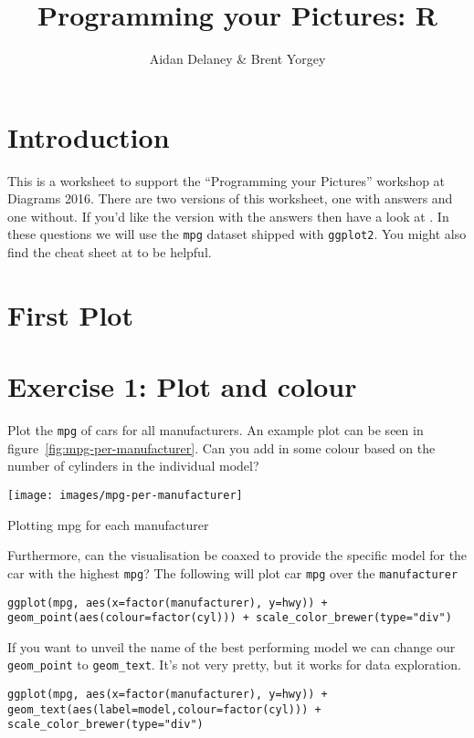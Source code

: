 \documentclass{tufte-handout}
\title{Programming your Pictures: R}
\author{Aidan Delaney \& Brent Yorgey}
\begin{document}
\maketitle
\section*{Introduction}
This is a worksheet to support the ``Programming your Pictures'' workshop at Diagrams 2016.  There are two versions of this worksheet, one with answers and one without.  If you'd like the version with the answers then have a look at .  In these questions we will use the \lstinline{mpg} dataset shipped with \lstinline{ggplot2}.  You might also find the cheat sheet at  to be helpful.

\section*{First Plot}

\section*{Exercise 1: Plot and colour}
Plot the \lstinline{mpg} of cars for all manufacturers.  An example plot can be seen in figure~\ref{fig:mpg-per-manufacturer}.  Can you add in some colour based on the number of cylinders in the individual model?
\begin{marginfigure}
  \texttt{[image: images/mpg-per-manufacturer]}
  \caption{Plotting mpg for each manufacturer}
  \label{fig:mpg-per-manufacturer}
\end{marginfigure}

\noindent Furthermore, can the visualisation be coaxed to provide the specific model for the car with the highest \lstinline{mpg}?
\ifanswers
The following will plot car \lstinline{mpg} over the \lstinline{manufacturer}
\begin{lstlisting}
ggplot(mpg, aes(x=factor(manufacturer), y=hwy)) + geom_point(aes(colour=factor(cyl))) + scale_color_brewer(type="div")
\end{lstlisting}

If you want to unveil the name of the best performing model we can change our \lstinline{geom_point} to \lstinline{geom_text}.  It's not very pretty, but it works for data exploration.
\begin{lstlisting}
ggplot(mpg, aes(x=factor(manufacturer), y=hwy)) + geom_text(aes(label=model,colour=factor(cyl))) + scale_color_brewer(type="div")
\end{lstlisting}
\fi
\end{document}
